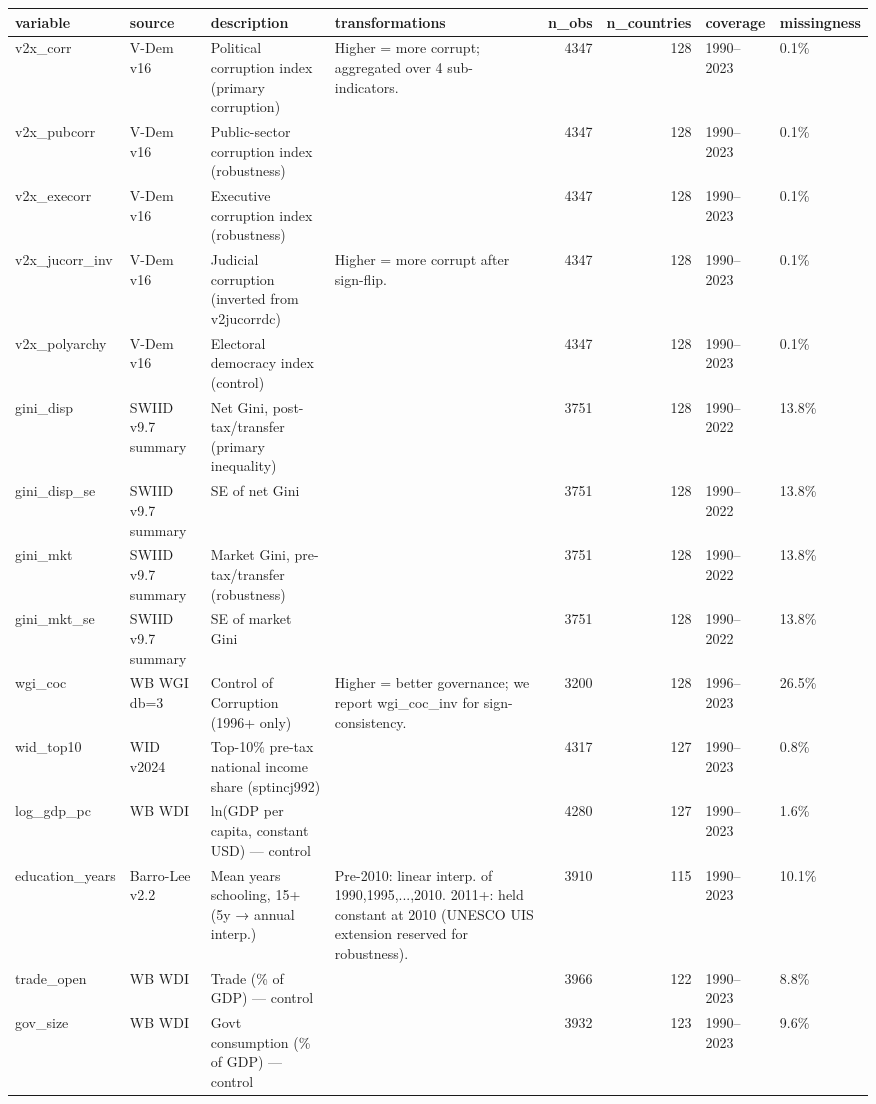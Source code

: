 \begin{tabular}{llllrrll}
\toprule
variable & source & description & transformations & n\_obs & n\_countries & coverage & missingness \\
\midrule
v2x\_corr & V-Dem v16 & Political corruption index (primary corruption) & Higher = more corrupt; aggregated over 4 sub-indicators. & 4347 & 128 & 1990–2023 & 0.1\% \\
v2x\_pubcorr & V-Dem v16 & Public-sector corruption index (robustness) &  & 4347 & 128 & 1990–2023 & 0.1\% \\
v2x\_execorr & V-Dem v16 & Executive corruption index (robustness) &  & 4347 & 128 & 1990–2023 & 0.1\% \\
v2x\_jucorr\_inv & V-Dem v16 & Judicial corruption (inverted from v2jucorrdc) & Higher = more corrupt after sign-flip. & 4347 & 128 & 1990–2023 & 0.1\% \\
v2x\_polyarchy & V-Dem v16 & Electoral democracy index (control) &  & 4347 & 128 & 1990–2023 & 0.1\% \\
gini\_disp & SWIID v9.7 summary & Net Gini, post-tax/transfer (primary inequality) &  & 3751 & 128 & 1990–2022 & 13.8\% \\
gini\_disp\_se & SWIID v9.7 summary & SE of net Gini &  & 3751 & 128 & 1990–2022 & 13.8\% \\
gini\_mkt & SWIID v9.7 summary & Market Gini, pre-tax/transfer (robustness) &  & 3751 & 128 & 1990–2022 & 13.8\% \\
gini\_mkt\_se & SWIID v9.7 summary & SE of market Gini &  & 3751 & 128 & 1990–2022 & 13.8\% \\
wgi\_coc & WB WGI db=3 & Control of Corruption (1996+ only) & Higher = better governance; we report wgi\_coc\_inv for sign-consistency. & 3200 & 128 & 1996–2023 & 26.5\% \\
wid\_top10 & WID v2024 & Top-10\% pre-tax national income share (sptincj992) &  & 4317 & 127 & 1990–2023 & 0.8\% \\
log\_gdp\_pc & WB WDI & ln(GDP per capita, constant USD) — control &  & 4280 & 127 & 1990–2023 & 1.6\% \\
education\_years & Barro-Lee v2.2 & Mean years schooling, 15+ (5y → annual interp.) & Pre-2010: linear interp. of 1990,1995,...,2010. 2011+: held constant at 2010 (UNESCO UIS extension reserved for robustness). & 3910 & 115 & 1990–2023 & 10.1\% \\
trade\_open & WB WDI & Trade (\% of GDP) — control &  & 3966 & 122 & 1990–2023 & 8.8\% \\
gov\_size & WB WDI & Govt consumption (\% of GDP) — control &  & 3932 & 123 & 1990–2023 & 9.6\% \\
\bottomrule
\end{tabular}
